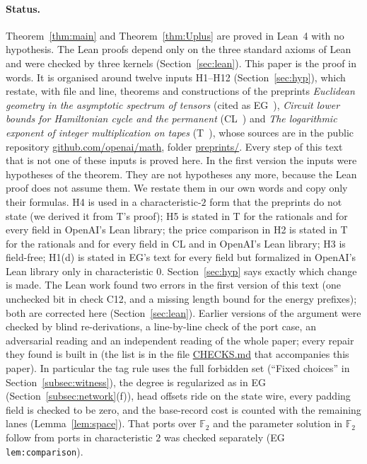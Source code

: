 \documentclass[11pt]{article}
\theoremstyle{definition}
\theoremstyle{remark}
\newcommand{\F}{\mathbb F}
\newcommand{\src}[1]{\url{#1}}
\begin{document}
\paragraph{Status.}
Theorem~\ref{thm:main} and Theorem~\ref{thm:Uplus} are proved in Lean~4 with no hypothesis. The Lean proofs depend only on the
three standard axioms of Lean and were checked by three kernels (Section~\ref{sec:lean}). This paper is the proof in words. It is
organised around twelve inputs H1--H12 (Section~\ref{sec:hyp}), which restate, with file and line, theorems and
constructions of the preprints \emph{Euclidean geometry in the asymptotic spectrum of tensors} (cited as EG~\cite{EG}), \emph{Circuit
lower bounds for Hamiltonian cycle and the permanent} (CL~\cite{CL}) and \emph{The logarithmic exponent of integer multiplication on tapes}
(T~\cite{T}), whose sources are in the public repository \src{github.com/openai/math}, folder \src{preprints/}. Every step of this
text that is not one of these inputs is proved here. In the first version the inputs were hypotheses of the theorem. They are
not hypotheses any more, because the Lean proof does not assume them. We restate them in our own words and copy only their formulas.
H4 is used in a characteristic-$2$ form that the preprints do not
state (we derived it from T's proof); H5 is stated in T for the rationals and for every field in OpenAI's Lean library; the price
comparison in H2 is stated in T for the rationals and for every field in CL and in OpenAI's Lean library; H3 is field-free; H1(d) is stated in EG's text for every field but formalized in OpenAI's Lean library
only in characteristic $0$. Section~\ref{sec:hyp} says exactly which change is made. The Lean work found two errors in the first version of this text
(one unchecked bit in check C12, and a missing length bound for the energy prefixes); both are corrected here
(Section~\ref{sec:lean}). Earlier versions of the argument were checked by blind re-derivations, a line-by-line check of
the port case, an adversarial reading and an independent reading of the whole paper; every repair they found is built in (the list
is in the file \src{CHECKS.md} that accompanies this paper). In particular the tag rule uses the full forbidden set (``Fixed
choices'' in Section~\ref{subsec:witness}), the degree is regularized as in EG (Section~\ref{subsec:network}(f)), head offsets ride on
the state wire, every padding field is checked to be zero, and the base-record cost is counted with the remaining lanes
(Lemma~\ref{lem:space}). That ports over $\F_2$ and the parameter solution in $\F_2$ follow from ports in characteristic $2$ was
checked separately (EG \texttt{lem:comparison}).
\end{document}
